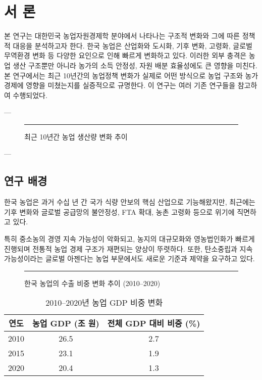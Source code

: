 \chapter{서 론}



본 연구는 대한민국 농업자원경제학 분야에서 나타나는 구조적 변화와 그에 따른 정책적 대응을 분석하고자 한다.  
한국 농업은 산업화와 도시화, 기후 변화, 고령화, 글로벌 무역환경 변화 등 다양한 요인으로 인해 빠르게 변화하고 있다.  
이러한 외부 충격은 농업 생산 구조뿐만 아니라 농가의 소득 안정성, 자원 배분 효율성에도 큰 영향을 미친다.  
본 연구에서는 최근 10년간의 농업정책 변화가 실제로 어떤 방식으로 농업 구조와 농가 경제에 영향을 미쳤는지를 실증적으로 규명한다.
이 연구는 여러 기존 연구들\cite{hong2020latex,doe2019intro}을 참고하여 수행되었다.


---

\begin{figure}[htbp]
  \centering
  \caption{최근 10년간 농업 생산량 변화 추이}\label{fig:chapter1_1}

  \rule{0.7\linewidth}{5cm} %
\end{figure}

---

\section{연구 배경}

한국 농업은 과거 수십 년 간 국가 식량 안보의 핵심 산업으로 기능해왔지만,  
최근에는 기후 변화와 글로벌 공급망의 불안정성, FTA 확대, 농촌 고령화 등으로 위기에 직면하고 있다.  

특히 중소농의 경영 지속 가능성이 악화되고, 농지의 대규모화와 영농법인화가 빠르게 진행되며  
전통적 농업 경제 구조가 재편되는 양상이 뚜렷하다. 또한, 탄소중립과 지속가능성이라는 글로벌 아젠다는  
농업 부문에서도 새로운 기준과 제약을 요구하고 있다.

\begin{figure}[htbp]
  \centering
  \rule{0.65\linewidth}{5cm}
  \caption{한국 농업의 수출 비중 변화 추이 (2010–2020)}\label{fig:chapter1_2}
\end{figure}

\begin{table}[htbp]
  \centering
  \begin{tabular}{|c|c|c|}
    \hline
    연도 & 농업 GDP (조 원) & 전체 GDP 대비 비중 (\%) \\
    \hline
    2010 & 26.5 & 2.7 \\
    2015 & 23.1 & 1.9 \\
    2020 & 20.4 & 1.3 \\
    \hline
  \end{tabular}
  \caption{2010–2020년 농업 GDP 비중 변화}\label{tab:chapter1_1}
\end{table}



